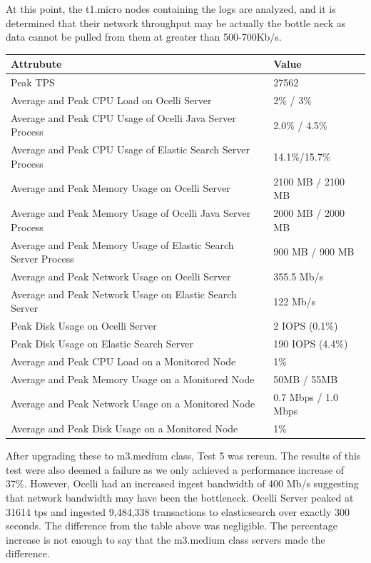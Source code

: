 \documentclass{llncs}
\begin{document}
At this point, the t1.micro nodes containing the logs are analyzed, and it is determined that their network throughput may be actually the bottle neck as data cannot be pulled from them at greater than 500-700Kb/s. 

\begin{flushleft}
    \begin{tabular}{ | l | l |}
    \hline
  Attrubute & Value  \\ \hline
  Peak TPS & 27562  \\ \hline
  Average and Peak CPU Load on Ocelli Server &2\% / 3\%  \\ \hline
  Average and Peak CPU Usage of Ocelli Java Server Process & 2.0\% / 4.5\% \\ \hline
 Average and Peak CPU Usage of Elastic Search Server Process & 14.1\%/15.7\%	  \\ \hline
  Average and Peak Memory Usage on Ocelli Server & 2100 MB / 2100 MB	 \\ \hline
  Average and Peak Memory Usage of Ocelli Java Server Process &	2000 MB / 2000 MB		 \\ \hline
 Average and Peak Memory Usage of Elastic Search Server Process &	900 MB / 900 MB		 \\ \hline
Average and Peak Network Usage on Ocelli Server &	355.5 Mb/s 	 \\ \hline
Average and Peak Network Usage on Elastic Search Server & 122 Mb/s 	 \\ \hline
Peak Disk Usage on Ocelli Server &	2 IOPS (0.1\%)		 \\ \hline
Peak Disk Usage on Elastic Search Server &	190 IOPS (4.4\%)		 \\ \hline
Average and Peak CPU Load on a Monitored Node& 	1\% 	 \\ \hline
  Average and Peak Memory Usage on a Monitored Node &	50MB / 55MB	 \\ \hline
Average and Peak Network Usage on a Monitored Node &	0.7 Mbps / 1.0 Mbps		 \\ \hline
  Average and Peak Disk Usage on a Monitored Node &  1\%	\\ 
    \hline
    \end{tabular}
\end{flushleft}

After upgrading these to m3.medium class, Test 5 was rereun. The results of this test were also deemed a failure as we only achieved a performance increase of 37\%. However, Ocelli had an increased ingest bandwidth of 400 Mb/s suggesting that network bandwidth may have been the bottleneck. Ocelli Server peaked at 31614 tps and ingested 9,484,338 transactions to elasticsearch over exactly 300 seconds. The difference from the table above was negligible. The percentage increase is not enough to say that the m3.medium class servers made the difference.
\end{document}

